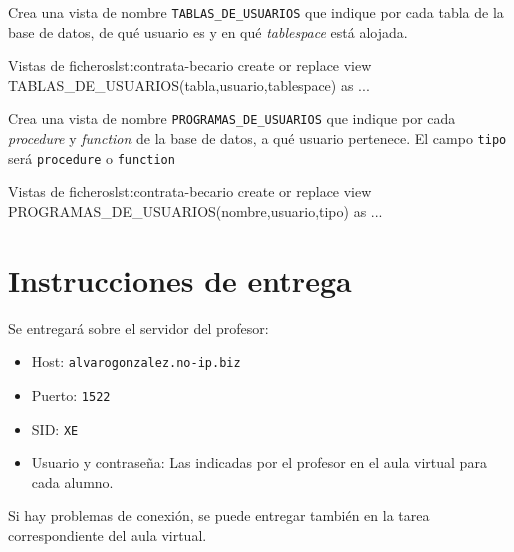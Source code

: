 \begin{homeworkProblem}
  Crea una vista de nombre \texttt{TABLAS\_DE\_USUARIOS} que indique por cada tabla de la base de datos, de qué usuario es y en qué \textit{tablespace} está alojada.

\begin{listadosql}{Vistas de ficheros}{lst:contrata-becario}
create or replace view TABLAS_DE_USUARIOS(tabla,usuario,tablespace) as ...
\end{listadosql}
  
\end{homeworkProblem}


\begin{homeworkProblem}
  Crea una vista de nombre \texttt{PROGRAMAS\_DE\_USUARIOS} que indique por cada \textit{procedure} y \textit{function} de la base de datos, a qué usuario pertenece. El campo \texttt{tipo} será \texttt{procedure} o \texttt{function}

\begin{listadosql}{Vistas de ficheros}{lst:contrata-becario}
create or replace view PROGRAMAS_DE_USUARIOS(nombre,usuario,tipo) as ...
\end{listadosql}
  
\end{homeworkProblem}

\section{Instrucciones de entrega}
Se entregará sobre el servidor del profesor:
\begin{itemize}
\item Host: \texttt{alvarogonzalez.no-ip.biz}
\item Puerto: \texttt{1522}
\item SID: \texttt{XE}
\item Usuario y contraseña: Las indicadas por el profesor en el aula virtual para cada alumno.
\end{itemize}

Si hay problemas de conexión, se puede entregar también en la tarea correspondiente del aula virtual.








